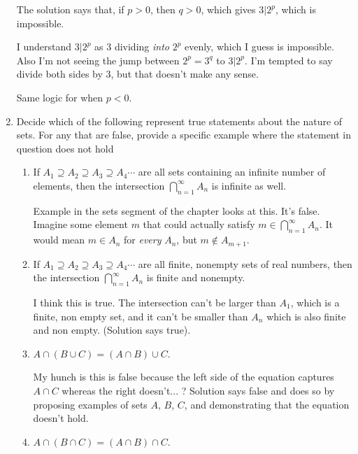 \documentclass{article}
\numberwithin{equation}{subsection}
\numberwithin{theo}{subsection}
\begin{document}
\begin{enumerate}
The solution says that, if $p > 0$, then $q > 0$, which gives $3|2^p$, which is
impossible.

I understand $3|2^p$ as $3$ dividing \emph{into} $2^p$ evenly, which I guess is
impossible. Also I'm not seeing the jump between $2^p = 3^q$ to $3|2^p$. I'm
tempted to say divide both sides by $3$, but that doesn't make any sense.

Same logic for when $p < 0$.

\item Decide which of the following represent true statements about the nature
    of sets. For any that are false, provide a specific example where the
    statement in question does not hold

    \begin{enumerate}
        \item If $A_1 \supseteq A_2 \supseteq A_3 \supseteq A_4 \cdots$ are all
            sets containing an infinite number of elements, then the
            intersection $\bigcap_{n=1}^\infty A_n$ is infinite as well.

            Example in the sets segment of the chapter looks at this. It's
            false. Imagine some element $m$ that could actually satisfy $m \in
            \bigcap_{n=1}^{\infty} A_n$. It would mean $m \in A_n$ for
            \emph{every} $A_n$, but $m \notin A_{m+1}$.

        \item If $A_1 \supseteq A_2 \supseteq A_3 \supseteq A_4 \cdots$ are all
            finite, nonempty sets of real numbers, then the intersection
            $\bigcap_{n=1}^\infty A_n$ is finite and nonempty.

            I think this is true. The intersection can't be larger than $A_1$,
            which is a finite, non empty set, and it can't be smaller than $A_n$
            which is also finite and non empty. (Solution says true).

        \item $A \cap (B \cup C) = (A \cap B) \cup C$.
            
            My hunch is this is false because the left side of the equation
            captures $A \cap C$ whereas the right doesn't... ? Solution says
            false and does so by proposing examples of sets $A$, $B$, $C$, and
            demonstrating that the equation doesn't hold.

        \item $A \cap (B \cap C) = (A \cap B) \cap C$.


\end{enumerate}
\end{enumerate}
\end{document}

